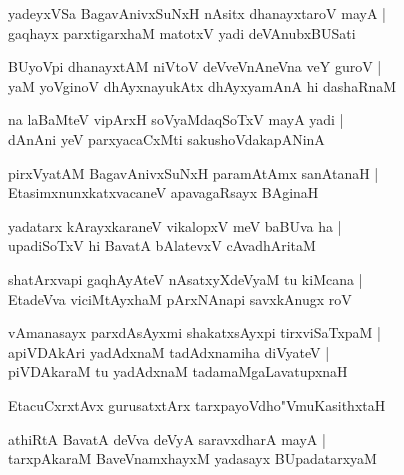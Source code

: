 \begin{shloka}
yadeyxVSa BagavAnivxSuNxH nAsitx dhanayxtaroV mayA |\\
gaqhayx parxtigarxhaM matotxV yadi deVAnubxBUSati
\end{shloka}

\begin{shloka}
BUyoVpi dhanayxtAM niVtoV deVveVnAneVna veY guroV |\\
yaM yoVginoV dhAyxnayukAtx dhAyxyamAnA hi dashaRnaM
\end{shloka}

\begin{shloka}
na laBaMteV vipArxH soVyaMdaqSoTxV mayA yadi |\\
dAnAni yeV parxyacaCxMti sakushoVdakapANinA
\end{shloka}

\begin{shloka}
pirxVyatAM BagavAnivxSuNxH paramAtAmx sanAtanaH |\\
EtasimxnunxkatxvacaneV apavagaRsayx BAginaH
\end{shloka}

\begin{shloka}
yadatarx kArayxkaraneV vikalopxV meV baBUva ha |\\
upadiSoTxV hi BavatA bAlatevxV cAvadhAritaM
\end{shloka}

\begin{shloka}
shatArxvapi gaqhAyAteV nAsatxyXdeVyaM tu kiMcana |\\
EtadeVva viciMtAyxhaM pArxNAnapi savxkAnugx roV
\end{shloka}

\begin{shloka}
vAmanasayx parxdAsAyxmi shakatxsAyxpi tirxviSaTxpaM |\\
apiVDAkAri yadAdxnaM tadAdxnamiha diVyateV |\\
piVDAkaraM tu yadAdxnaM tadamaMgaLavatupxnaH 
\end{shloka}

\begin{shloka}
EtacuCxrxtAvx gurusatxtArx tarxpayoVdho"VmuKasithxtaH
\end{shloka}

\begin{shloka}
athiRtA BavatA deVva deVyA saravxdharA mayA |\\
tarxpAkaraM BaveVnamxhayxM yadasayx BUpadatarxyaM
\end{shloka}

